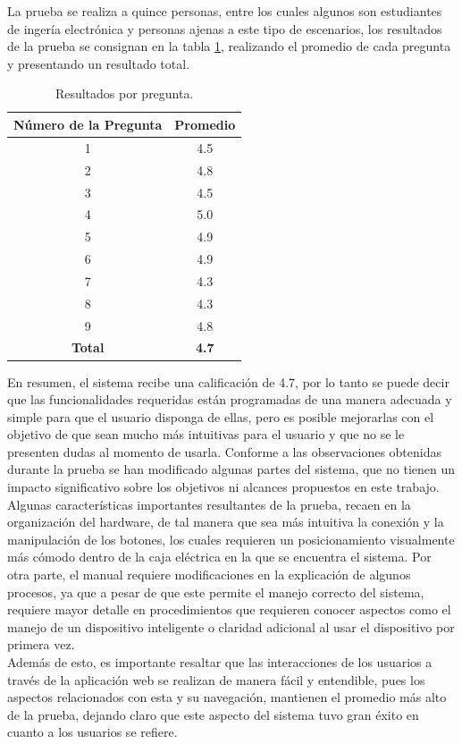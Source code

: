 La prueba se realiza a quince personas, entre los cuales algunos son estudiantes de ingería electrónica y personas ajenas a este tipo de escenarios, los resultados de la prueba se consignan en la tabla \ref{table:enc}, realizando el promedio de cada pregunta y presentando un resultado total.\\

\begin{table}
	\begin{center}
		\caption{Resultados por pregunta.}
		\label{table:enc}
		\begin{tabular}{|c|c|}
			\hline 
			\textbf{Número de la Pregunta} & \textbf{Promedio} \\ 
			\hline 
			1 & 4.5\\ 
			\hline 
			2 & 4.8\\ 
			\hline 
			3 & 4.5\\ 
			\hline 
			4 & 5.0\\ 
			\hline 
			5 & 4.9\\ 
			\hline 
			6 & 4.9\\ 
			\hline 
			7 & 4.3\\ 
			\hline 
			8 & 4.3\\ 
			\hline 
			9 & 4.8\\ 
			\hline 
			\textbf{Total} & \textbf{4.7}\\ 
			\hline 
		\end{tabular} 
	\end{center}
\end{table}

En resumen, el sistema recibe una calificación de 4.7, por lo tanto se puede decir que las funcionalidades requeridas están programadas de una manera adecuada y simple para que el usuario disponga de ellas, pero es posible mejorarlas con el objetivo de que sean mucho más intuitivas para el usuario y que no se le presenten dudas al momento de usarla. Conforme a las observaciones obtenidas durante la prueba se han modificado algunas partes del sistema, que no tienen un impacto significativo sobre los objetivos ni alcances propuestos en este trabajo.\\

Algunas características importantes resultantes de la prueba, recaen en la organización del hardware, de tal manera que sea más intuitiva la conexión y la manipulación de los botones, los cuales requieren un posicionamiento visualmente más cómodo dentro de la caja eléctrica en la que se encuentra el sistema. Por otra parte, el manual requiere modificaciones en la explicación de algunos procesos, ya que a pesar de que este permite el manejo correcto del sistema, requiere mayor detalle en procedimientos que requieren conocer aspectos como el manejo de un dispositivo inteligente o claridad adicional al usar el dispositivo por primera vez.\\

Además de esto, es importante resaltar que las interacciones de los usuarios a través de la aplicación web se realizan de manera fácil y entendible, pues los aspectos relacionados con esta y su navegación, mantienen el promedio más alto de la prueba, dejando claro que este aspecto del sistema tuvo gran éxito en cuanto a los usuarios se refiere.\\
